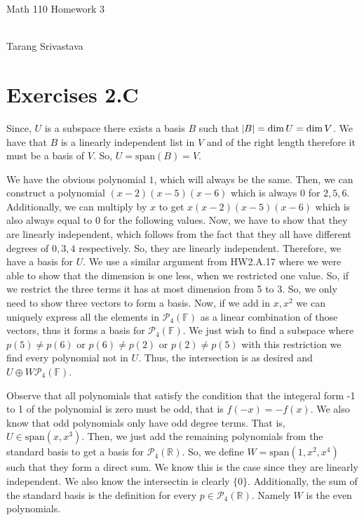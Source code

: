 \documentclass[10pt, twocolumn]{article}
\author{Tarang Srivastava}
\newcommand{\R}{\mathbb{R}}
\newcommand{\F}{\mathbb{F}}
\newcommand{\poly}[2]{\mathcal{P}_{#1}\left(#2\right)}
\newcommand{\vspan}[1]{\text{span}\left(#1\right)}
\newcommand{\makechaptertitle}[1]{
\begin{center}
	\begin{large}
		#1
	\end{large}
	\begin{small}
		\\Tarang Srivastava
	\end{small}
\end{center}
}
\begin{document}
	
\makechaptertitle{Math 110 Homework 3}

\section{Exercises 2.C}
\begin{q}[1]
	Since, $ U $ is a subspace there exists a basis $ B $ such that $ \abs{B} = \dim U = \dim V$.
	We have that $ B $ is a linearly independent list in $ V $ and of the right length therefore it must be a basis of $ V $.
	So, $ U = \vspan{B} = V $.
\end{q}
\begin{q}[7]
	We have the obvious polynomial $ 1 $, which will always be the same. 
	Then, we can construct a polynomial $ (x - 2)(x-5)(x-6) $ which is always 0 for $2, 5, 6 $. 
	Additionally, we can multiply by $ x $ to get $ x(x-2)(x-5)(x-6) $ which is also always equal to 0 for the following values. 
	Now, we have to show that they are linearly independent, which follows from the fact that they all have different degrees of $ 0, 3, 4 $ respectively. 
	So, they are linearly independent. Therefore, we have a basis for $ U $. 
	We use a similar argument from HW2.A.17 where we were able to show that the dimension is one less, when we restricted one value. 
	So, if we restrict the three terms it has at most dimension from 5 to 3. So, we only need to show three vectors to form a basis.
	Now, if we add in $ x, x^2 $ we can uniquely express all the elements in $ \poly{4}{\F} $ as a linear combination of those vectors, 
	thus it forms a basis for $ \poly{4}{\F} $.
	We just wish to find a subspace where $ p(5) \neq p(6) $ or $ p(6)\neq p(2) $ or $ p(2) \neq p(5) $ with this restriction we find every polynomial not in $ U $. 
	Thus, the intersection is as desired and $ U \oplus W \poly{4}{\F} $.
\end{q}
\begin{q}[8]
	Observe that all polynomials that satisfy the condition that the integeral form -1 to 1 of the polynomial is zero 
	must be odd, that is $ f(-x) = -f(x) $. 
	We also know that odd polynomials only have odd degree terms. 
	That is, $ U \in \vspan{x, x^3} $.
	Then, we just add the remaining polynomials from the standard basis to get a basis for $ \poly{4}{\R} $.
	So, we define $ W = \vspan{1, x^2, x^4} $ such that they form a direct sum. 
	We know this is the case since they are linearly independent.
	We also know the intersectin is clearly $ \{0\} $.
	Additionally, the sum of the standard basis is the definition for every $ p \in \poly{4}{\R} $.
	Namely $ W $ is the even polynomials.
\end{q}
\end{document}
